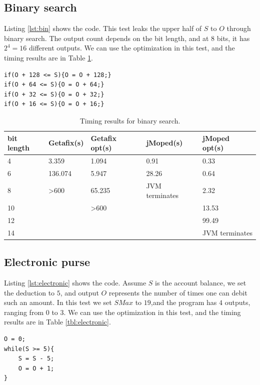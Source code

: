 \subsection{Binary search}
Listing \ref{lst:bin} shows the code. This test leaks the upper half of $S$ to $O$ through binary search. The output count depends on the bit length, and at $8$ bits, it has $2^{4} = 16$ different outputs. We can use the optimization in this test, and the timing results are in Table \ref{tbl:bin}.

\lstset{language=C} 
\begin{lstlisting}[float=!h, caption={Binary search test program at 8 bits.},label=lst:bin]
if(O + 128 <= S){O = O + 128;}
if(O + 64 <= S){O = O + 64;}
if(O + 32 <= S){O = O + 32;}
if(O + 16 <= S){O = O + 16;}
\end{lstlisting}

\begin{table}[!h]
\begin{center}
\begin{tabular}{|l|l|l|l|l|}
\hline
bit length & Getafix(s) & Getafix opt(s) & jMoped(s) & jMoped opt(s) \\ \hline
4 & 3.359 & 1.094 & 0.91 & 0.33 \\ \hline
6 & 136.074 & 5.947 & 28.26 & 0.64 \\ \hline
8 & \textgreater600 & 65.235 & JVM terminates & 2.32 \\ \hline
10 &  & \textgreater600 &  & 13.53 \\ \hline
12 &  &  &  & 99.49 \\ \hline
14 &  &  &  & JVM terminates \\ \hline
\end{tabular}
\end{center}
\caption{Timing results for binary search.}
\label{tbl:bin}
\end{table}

\subsection{Electronic purse}
Listing \ref{lst:electronic} shows the code. Assume $S$ is the account balance, we set the deduction to $5$, and output $O$ represents the number of times one can debit such an amount.  In this test we set $SMax$ to $19$,and the program has $4$ outputs, ranging from $0$ to $3$. We can use the optimization in this test, and the timing results are in Table \ref{tbl:electronic}.

\lstset{language=C}  
\begin{lstlisting}[float=!h, caption={Electronic purse test program.},label=lst:electronic]
O = 0;
while(S >= 5){
	S = S - 5;
	O = O + 1;
}
\end{lstlisting}

